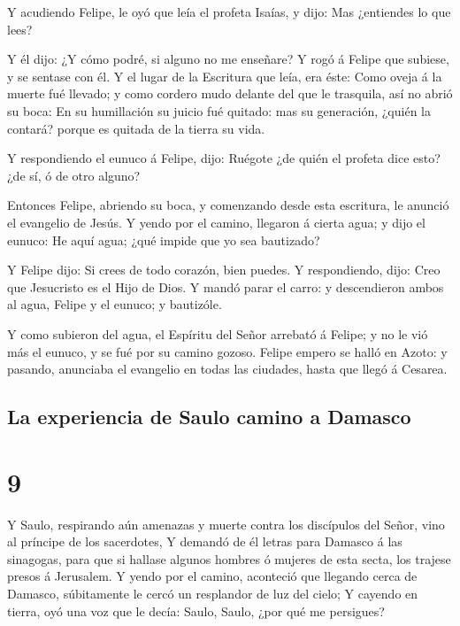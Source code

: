  Y acudiendo Felipe, le oyó que leía el profeta Isaías, y
dijo: Mas ¿entiendes lo que lees?

 Y él dijo: ¿Y cómo podré, si alguno no me enseñare? Y
rogó á Felipe que subiese, y se sentase con él.  Y el
lugar de la Escritura que leía, era éste: Como oveja á la muerte fué
llevado; y como cordero mudo delante del que le trasquila, así no abrió
su boca:  En su humillación su juicio fué quitado: mas su
generación, ¿quién la contará? porque es quitada de la tierra su vida.

 Y respondiendo el eunuco á Felipe, dijo: Ruégote ¿de
quién el profeta dice esto? ¿de sí, ó de otro alguno?

 Entonces Felipe, abriendo su boca, y comenzando desde
esta escritura, le anunció el evangelio de Jesús.  Y
yendo por el camino, llegaron á cierta agua; y dijo el eunuco: He aquí
agua; ¿qué impide que yo sea bautizado?

 Y Felipe dijo: Si crees de todo corazón, bien puedes. Y
respondiendo, dijo: Creo que Jesucristo es el Hijo de Dios.
 Y mandó parar el carro: y descendieron ambos al agua,
Felipe y el eunuco; y bautizóle.

 Y como subieron del agua, el Espíritu del Señor arrebató
á Felipe; y no le vió más el eunuco, y se fué por su camino gozoso.
 Felipe empero se halló en Azoto: y pasando, anunciaba el
evangelio en todas las ciudades, hasta que llegó á Cesarea.

\hypertarget{la-experiencia-de-saulo-camino-a-damasco}{%
\subsection{La experiencia de Saulo camino a
Damasco}\label{la-experiencia-de-saulo-camino-a-damasco}}

\hypertarget{section-8}{%
\section{9}\label{section-8}}

 Y Saulo, respirando aún amenazas y muerte contra los
discípulos del Señor, vino al príncipe de los sacerdotes, 
Y demandó de él letras para Damasco á las sinagogas, para que si hallase
algunos hombres ó mujeres de esta secta, los trajese presos á Jerusalem.
 Y yendo por el camino, aconteció que llegando cerca de
Damasco, súbitamente le cercó un resplandor de luz del cielo;
 Y cayendo en tierra, oyó una voz que le decía: Saulo,
Saulo, ¿por qué me persigues?

